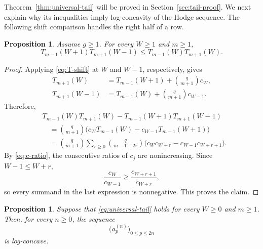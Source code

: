 \documentclass[12pt]{amsart}
\theoremstyle{plain}
\newtheorem{proposition}[theorem]{Proposition}
\theoremstyle{definition}
\theoremstyle{remark}
\begin{document}
Theorem~\ref{thm:universal-tail} will be proved in
Section~\ref{sec:tail-proof}.  We next explain why its inequalities imply
log-concavity of the Hodge sequence.  The following shift comparison handles
the right half of a row.

\begin{proposition}\label{prop:freezing}
Assume \(g\ge1\).  For every \(W\ge1\) and \(m\ge1\),
\[
 T_{m-1}(W+1)T_{m+1}(W-1)
 \le T_{m-1}(W)T_{m+1}(W).
\]
\end{proposition}

\begin{proof}
Applying \eqref{eq:T-shift} at \(W\) and \(W-1\), respectively, gives
\[
 \begin{aligned}
 T_{m+1}(W)
   &=T_{m-1}(W+1)+\binom q{m+1}c_W,\\
 T_{m+1}(W-1)
   &=T_{m-1}(W)+\binom q{m+1}c_{W-1}.
 \end{aligned}
\]
Therefore,
\begin{align*}
&T_{m-1}(W)T_{m+1}(W)
 -T_{m-1}(W+1)T_{m+1}(W-1)\\
&\quad=\binom q{m+1}
 \bigl(c_WT_{m-1}(W)-c_{W-1}T_{m-1}(W+1)\bigr)\\
&\quad=\binom q{m+1}
 \sum_{r\ge0}\binom q{m-1-2r}
 \bigl(c_Wc_{W+r}-c_{W-1}c_{W+r+1}\bigr).
\end{align*}
By \eqref{eq:c-ratio}, the consecutive ratios of \(c_j\) are
nonincreasing.  Since \(W-1\le W+r\),
\[
 \frac{c_W}{c_{W-1}}
 \ge \frac{c_{W+r+1}}{c_{W+r}},
\]
so every summand in the last expression is nonnegative.  This proves the
claim.
\end{proof}

\begin{proposition}\label{lem:tail-to-hodge}
Suppose that \eqref{eq:universal-tail} holds for every \(W\ge0\) and
\(m\ge1\).  Then, for every \(n\ge0\), the sequence
\[
 \bigl(a_p^{(n)}\bigr)_{0\le p\le2n}
\]
is log-concave.
\end{proposition}
\end{document}
